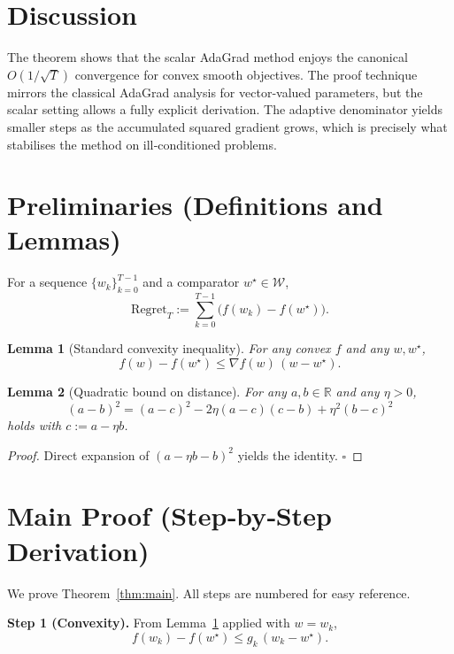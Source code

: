 \documentclass[11pt]{article}
\newtheorem{lemma}{Lemma}
\newcommand{\R}{\mathbb{R}}
\begin{document}
\section*{Discussion}
The theorem shows that the scalar AdaGrad method enjoys the canonical $O(1/\sqrt{T})$ convergence for convex smooth objectives.  
The proof technique mirrors the classical AdaGrad analysis for vector‑valued parameters, but the scalar setting allows a fully explicit derivation.  
The adaptive denominator yields smaller steps as the accumulated squared gradient grows, which is precisely what stabilises the method on ill‑conditioned problems.

\section*{Preliminaries (Definitions and Lemmas)}
\begin{definition}[Regret]
For a sequence $\{w_k\}_{k=0}^{T-1}$ and a comparator $w^\star\in\mathcal{W}$,
\[
\text{Regret}_T:=\sum_{k=0}^{T-1}\bigl(f(w_k)-f(w^\star)\bigr).
\]
\end{definition}
\begin{lemma}[Standard convexity inequality]\label{lem:conv}
For any convex $f$ and any $w,w^\star$,
\[
f(w)-f(w^\star)\le \nabla f(w)\,(w-w^\star).
\]
\end{lemma}
\begin{lemma}[Quadratic bound on distance]\label{lem:dist}
For any $a,b\in\R$ and any $\eta>0$,
\[
(a-b)^2 = (a-c)^2 -2\eta (a-c)(c-b)+\eta^2(b-c)^2
\]
holds with $c:=a-\eta b$.
\end{lemma}
\begin{proof}
Direct expansion of $(a-\eta b-b)^2$ yields the identity. \hfill $\square$
\end{proof}

\section*{Main Proof (Step‑by‑Step Derivation)}
We prove Theorem~\ref{thm:main}.  All steps are numbered for easy reference.

\bigskip
\noindent\textbf{Step 1 (Convexity).}  
From Lemma~\ref{lem:conv} applied with $w=w_k$,
\begin{equation}
f(w_k)-f(w^\star) \le g_k\,(w_k-w^\star). \tag{1}
\end{equation}
\end{document}
